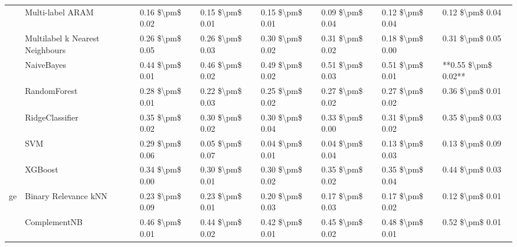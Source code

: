 \begin{tabular}{llllllll}
   & Multi-label ARAM &  0.16 \$\textbackslash pm\$ 0.02 &           0.15 \$\textbackslash pm\$ 0.01 &       0.15 \$\textbackslash pm\$ 0.01 &        0.09 \$\textbackslash pm\$ 0.04 &                         0.12 \$\textbackslash pm\$ 0.04 &      0.12 \$\textbackslash pm\$ 0.04 \\
   & Multilabel k Nearest Neighbours &  0.26 \$\textbackslash pm\$ 0.05 &           0.26 \$\textbackslash pm\$ 0.03 &       0.30 \$\textbackslash pm\$ 0.02 &        0.31 \$\textbackslash pm\$ 0.02 &                         0.18 \$\textbackslash pm\$ 0.00 &      0.31 \$\textbackslash pm\$ 0.05 \\
   & NaiveBayes &  0.44 \$\textbackslash pm\$ 0.01 &           0.46 \$\textbackslash pm\$ 0.02 &       0.49 \$\textbackslash pm\$ 0.02 &        0.51 \$\textbackslash pm\$ 0.03 &                         0.51 \$\textbackslash pm\$ 0.01 &  **0.55 \$\textbackslash pm\$ 0.02** \\
   & RandomForest &  0.28 \$\textbackslash pm\$ 0.01 &           0.22 \$\textbackslash pm\$ 0.03 &       0.25 \$\textbackslash pm\$ 0.02 &        0.27 \$\textbackslash pm\$ 0.02 &                         0.27 \$\textbackslash pm\$ 0.02 &      0.36 \$\textbackslash pm\$ 0.01 \\
   & RidgeClassifier &  0.35 \$\textbackslash pm\$ 0.02 &           0.30 \$\textbackslash pm\$ 0.02 &       0.30 \$\textbackslash pm\$ 0.04 &        0.33 \$\textbackslash pm\$ 0.00 &                         0.31 \$\textbackslash pm\$ 0.02 &      0.35 \$\textbackslash pm\$ 0.03 \\
   & SVM &  0.29 \$\textbackslash pm\$ 0.06 &           0.05 \$\textbackslash pm\$ 0.07 &       0.04 \$\textbackslash pm\$ 0.01 &        0.04 \$\textbackslash pm\$ 0.04 &                         0.13 \$\textbackslash pm\$ 0.03 &      0.13 \$\textbackslash pm\$ 0.09 \\
   & XGBoost &  0.34 \$\textbackslash pm\$ 0.00 &           0.30 \$\textbackslash pm\$ 0.01 &       0.30 \$\textbackslash pm\$ 0.02 &        0.35 \$\textbackslash pm\$ 0.02 &                         0.35 \$\textbackslash pm\$ 0.04 &      0.44 \$\textbackslash pm\$ 0.03 \\
ge & Binary Relevance kNN &  0.23 \$\textbackslash pm\$ 0.09 &           0.23 \$\textbackslash pm\$ 0.01 &       0.20 \$\textbackslash pm\$ 0.03 &        0.17 \$\textbackslash pm\$ 0.03 &                         0.17 \$\textbackslash pm\$ 0.02 &      0.12 \$\textbackslash pm\$ 0.01 \\
   & ComplementNB &  0.46 \$\textbackslash pm\$ 0.01 &           0.44 \$\textbackslash pm\$ 0.02 &       0.42 \$\textbackslash pm\$ 0.01 &        0.45 \$\textbackslash pm\$ 0.02 &                         0.48 \$\textbackslash pm\$ 0.01 &      0.52 \$\textbackslash pm\$ 0.01 \\

\end{tabular}
